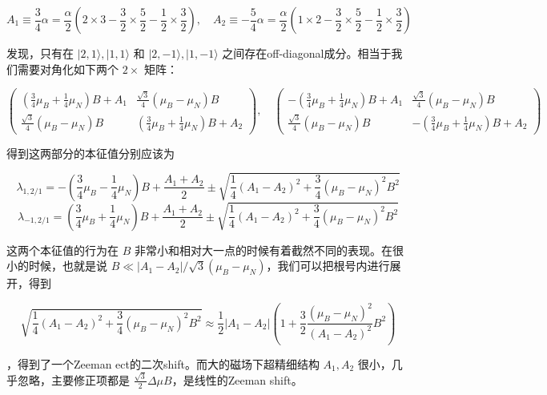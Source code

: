 \begin{equation}
A_1\equiv\frac{3}{4}\alpha = \frac{\alpha}{2}\left(2\times3 - \frac{3}{2}\times\frac{5}{2} - \frac{1}{2}\times\frac{3}{2}\right),\quad A_2 \equiv -\frac{5}{4}\alpha = \frac{\alpha}{2}\left(1\times2 - \frac{3}{2}\times\frac{5}{2} - \frac{1}{2}\times\frac{3}{2}\right)
\end{equation}

发现，只有在 $|2,1\rangle,|1,1\rangle$ 和 $|2,-1\rangle,|1,-1\rangle$ 之间存在off-diagonal成分。相当于我们需要对角化如下两个 $2\times$ 矩阵：

\begin{equation}
\left(
\begin{matrix}
\left(\frac{3}{4}\mu_B+\frac{1}{4}\mu_N\right)B+A_1 & \frac{\sqrt{3}}{4}(\mu_B-\mu_N)B\\
\frac{\sqrt{3}}{4}(\mu_B-\mu_N)B & \left(\frac{3}{4}\mu_B+\frac{1}{4}\mu_N\right)B+A_2
\end{matrix}
\right),\quad 
\left(
\begin{matrix}
-\left(\frac{3}{4}\mu_B+\frac{1}{4}\mu_N\right)B+A_1 & \frac{\sqrt{3}}{4}(\mu_B-\mu_N)B\\
\frac{\sqrt{3}}{4}(\mu_B-\mu_N)B & -\left(\frac{3}{4}\mu_B+\frac{1}{4}\mu_N\right)B+A_2
\end{matrix}
\right)
\end{equation}

得到这两部分的本征值分别应该为

\begin{equation}
\lambda_{1,2/1} = -\left(\frac{3}{4}\mu_B-\frac{1}{4}\mu_N\right)B+\frac{A_1+A_2}{2} \pm \sqrt{\frac{1}{4}(A_1-A_2)^2+\frac{3}{4}(\mu_B-\mu_N)^2B^2}
\end{equation}
\begin{equation}
\lambda_{-1,2/1} = \left(\frac{3}{4}\mu_B+\frac{1}{4}\mu_N\right)B+\frac{A_1+A_2}{2} \pm \sqrt{\frac{1}{4}(A_1-A_2)^2+\frac{3}{4}(\mu_B-\mu_N)^2B^2}
\end{equation}

这两个本征值的行为在 $B$ 非常小和相对大一点的时候有着截然不同的表现。在很小的时候，也就是说 $B\ll|A_1-A_2| / \sqrt{3}(\mu_B-\mu_N)$，我们可以把根号内进行展开，得到

\begin{equation}
\sqrt{\frac{1}{4}(A_1-A_2)^2+\frac{3}{4}(\mu_B-\mu_N)^2B^2} \approx \frac{1}{2}|A_1-A_2| (1+\frac{3}{2}\frac{(\mu_B-\mu_N)^2}{(A_1-A_2)^2}B^2)
\end{equation}

，得到了一个Zeeman ect的二次shift。而大的磁场下超精细结构 $A_1, A_2$ 很小，几乎忽略，主要修正项都是 $\frac{\sqrt{3}}{2}\Delta\mu B$，是线性的Zeeman shift。

